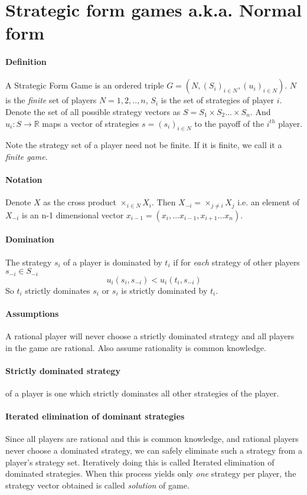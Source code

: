 \section{Strategic form games a.k.a. Normal form}
\paragraph{Definition} A Strategic Form Game is an ordered triple $G = (N, (S_i)_{i \in N}, (u_i)_{i \in N})$. $N$ is the \textit{finite} set of players $N = {1,2,..,n}$, $S_i$ is the set of strategies of player $i$. Denote the set of all possible strategy vectors as $S = S_1 \times S_2 ... \times S_n$. And $u_i: S \to \mathbb{R}$ maps a vector of strategies $s = (s_i)_{i \in N}$ to the payoff of the $i^{th}$ player. 

Note the strategy set of a player need not be finite. If it is finite, we call it a \textit{finite game}.

\paragraph{Notation} Denote $X$ as the cross product $\times_{i \in N}X_i$. Then $X_{-i} = \times_{j\neq i}X_j$ i.e. an element of $X_{-i}$ is an n-1 dimensional vector $x_{i-1} = (x_i, ... x_{i-1}, x_{i+1}... x_n)$.

\paragraph{Domination} The strategy $s_i$ of a player is dominated by $t_i$ if for \textit{each} strategy of other players $s_{-i} \in S_{-i}$ 
\[
    u_i(s_i, s_{-i}) < u_i(t_i, s_{-i})
\]
So $t_i$ strictly dominates $s_i$ or $s_i$ is strictly dominated by $t_i$.

\paragraph{Assumptions} A rational player will never choose a strictly dominated strategy and all players in the game are rational. Also assume rationality is common knowledge.

\paragraph{Strictly dominated strategy} of a player is one which strictly dominates all other strategies of the player.

\paragraph{Iterated elimination of dominant strategies} Since all players are rational and this is common knowledge, and rational players never choose a dominated strategy, we can safely eliminate such a strategy from a player's strategy set. Iteratively doing this is called Iterated elimination of dominated strategies. When this process yields only \textit{one} strategy per player, the strategy vector obtained is called \textit{solution} of game.


